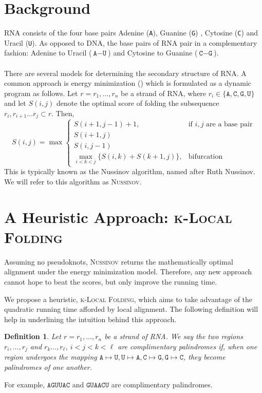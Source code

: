 \documentclass[11pt]{article}
\newcommand{\A}{\texttt{A}}
\newcommand{\G}{\texttt{G}}
\newcommand{\U}{\texttt{U}}
\newcommand{\C}{\texttt{C}}
\newcommand{\klf}{\textsc{k-Local Folding}\xspace}
\newcommand{\rf}{\textsc{Nussinov}\xspace}
\newtheorem{definition}{Definition}
\newcommand{\s}{\\\\}
\begin{document}
\section{Background}
RNA consists of the four base pairs Adenine (\A), Guanine (\G) , Cytosine (\C) and Uracil (\U). As opposed to DNA, the base pairs of RNA pair in a complementary fashion: Adenine to Uracil ($\A-\U$) and Cytosine to Guanine ($\C-\G$). \s

There are several models for determining the secondary structure of RNA.  A common approach is energy minimization (\cite{three}) which is formulated as a dynamic program as follows. Let $r=r_1,\ldots,r_n$ be a strand of RNA, where $r_i\in\{\A,\C,\G,\U\}$ and let $S(i,j)$ denote the optimal score of folding the subsequence $r_i,r_{i+1}\ldots r_j\subset r$. Then, 
\[S(i,j)=\max\begin{cases}
S(i+1,j-1)+1,&\text{if }i,j\text{ are a base pair}\\
S(i+1,j)\\
S(i,j-1)\\
\max_{i<k<j}\{S(i,k)+S(k+1,j)\},&\text{bifurcation}
\end{cases}\]
This is typically known as the Nussinov algorithm, named after Ruth Nussinov. We will refer to this algorithm as \rf. 


\section{A Heuristic Approach: \klf}
Assuming no pseudoknots, \rf returns the mathematically optimal alignment under the energy minimization model. Therefore, any new approach cannot hope to beat the scores, but only improve the running time.

We propose a heuristic, \klf, which aims to take advantage of the quadratic running time afforded by local alignment. The following definition will help in underlining the intuition behind this approach. 

\begin{definition}
Let $r=r_1,\ldots,r_n$ be a strand of RNA. 
We say the two regions $r_i,\ldots,r_j$ and $r_k\ldots,r_\ell$, $i<j<k<\ell$ are complimentary palindromes if, when one region undergoes the mapping $\A\mapsto \U, \U\mapsto\A, \C\mapsto\G, \G\mapsto\C$, they become palindromes of one another.  
\end{definition}

For example, $\A\G\U\U\A\C$ and $\G\U\A\A\C\U$ are complimentary palindromes. \\
\end{document}
